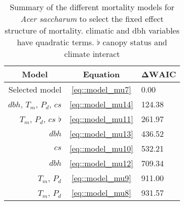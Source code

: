 \begin{refsection}
\begin{table}
	\centering
	\caption{Summary of the different mortality models for \textit{Acer saccharum} to select the fixed effect structure of mortality. \dag climatic and dbh variables have quadratic terms. $ \flat $ canopy status and climate interact}
	\label{tab::acsa_fixeff_mu}
	\begin{tabular}{@{}rcl@{}}
	\toprule
	\multicolumn{1}{c}{\textbf{Model}} & \multicolumn{1}{c}{\textbf{Equation}} & \multicolumn{1}{c}{$ \bm{\Delta \text{WAIC}} $} \\
	\midrule
		Selected model & \ref{eq::model_mu7} & 0.00 \\
		$ dbh $, $ T_m $, $ P_d $, $ cs $ \dag & \ref{eq::model_mu14} & 124.38 \\
		$ T_m $, $ P_d $, $ cs $ \dag $ \flat $ & \ref{eq::model_mu11} & 261.97 \\
		$ dbh $ \dag & \ref{eq::model_mu13} & 436.52 \\
		$ cs $ & \ref{eq::model_mu10} & 532.21 \\
		$ dbh $ & \ref{eq::model_mu12} & 709.34 \\
		$ T_m $, $ P_d $ \dag & \ref{eq::model_mu9} & 911.00 \\
		$ T_m $, $ P_d $ & \ref{eq::model_mu8} & 931.57 \\
   \bottomrule
	\end{tabular}
\end{table}


\end{refsection}

